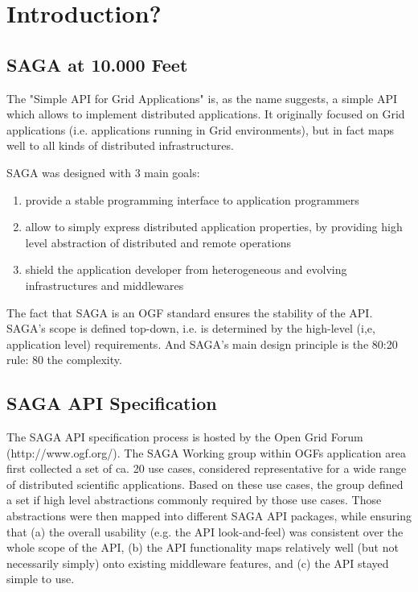 \documentclass[3p,twocolumn]{article}
\begin{document}
\section{Introduction?}

 \subsection{SAGA at 10.000 Feet}

  The "Simple API for Grid Applications"  is, as the name suggests, a
  simple API which allows to implement distributed applications.  It
  originally focused on Grid applications (i.e. applications running
  in Grid environments), but in fact maps well to all kinds of
  distributed infrastructures.

  SAGA was designed with 3 main goals:

  \begin{enumerate}

   \item provide a stable programming interface to application
   programmers
 
   \item allow to simply express distributed application properties,
   by providing high level abstraction of distributed and remote
   operations
   
   \item shield the application developer from heterogeneous and
   evolving infrastructures and middlewares

  \end{enumerate}
 


  The fact that SAGA is an OGF standard ensures the stability of the
  API.   SAGA's scope is defined top-down, i.e. is determined by the
  high-level (i,e, application level) requirements.  And SAGA's main
  design principle is the 80:20 rule: 80%
  the complexity.

 \subsection{SAGA API Specification}

  The SAGA API specification process is hosted by the Open Grid Forum
  (http://www.ogf.org/).  The SAGA Working group within OGFs
  application area first collected a set of ca. 20 use cases,
  considered representative for a wide range of distributed scientific
  applications.  Based on these use cases, the group defined a set if
  high level abstractions commonly required by those use cases.  Those
  abstractions were then mapped into different SAGA API packages,
  while ensuring that (a) the overall usability (e.g. the API
  look-and-feel) was consistent over the whole scope of the API, (b)
  the API functionality maps relatively well (but not necessarily
  simply) onto existing middleware features, and (c) the API stayed
  simple to use.
\end{document}
